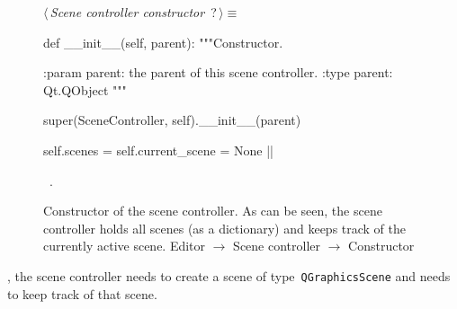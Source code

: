 \documentclass[%
    a4paper,    %
    justified,  %
    nobib,      %
    openany     %
]{tufte-book}
\begin{document}
\begin{figure}
\begin{flushleft} \small
\begin{minipage}{\linewidth}\label{scrap92}\raggedright\small
{} $\langle\,${\itshape Scene controller constructor}\nobreak\ {\footnotesize {?}}$\,\rangle\equiv$
\vspace{-1ex}
\begin{pythoncode}
def __init__(self, parent):
    """Constructor.

    :param parent: the parent of this scene controller.
    :type parent: Qt.QObject
    """

    super(SceneController, self).__init__(parent)

    self.scenes = {}
    self.current_scene = None
|\NWsep|
\end{pythoncode}
\vspace{1.5ex}
\footnotesize
\begin{list}{}{\setlength{\itemsep}{-\parsep}\setlength{\itemindent}{-\leftmargin}}
\item \NWtxtMacroRefIn\ .

\item{}
\end{list}
\end{minipage}\vspace{4ex}
\end{flushleft}
\caption{Constructor of the scene controller. As can be seen, the scene
  controller holds all scenes (as a dictionary) and keeps track of the currently
  active scene.
  \newline{}\newline{}Editor $\rightarrow$ Scene controller $\rightarrow$
  Constructor}
\label{editor:lst:scene-controller:constructor}
\end{figure}

, the scene controller needs to
create a scene of type~\verb=QGraphicsScene= and needs to keep track of that
scene.
\end{document}
